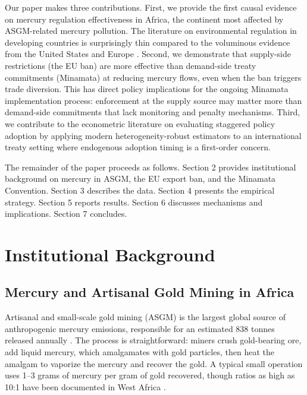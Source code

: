 \documentclass[12pt]{article}
\begin{document}
Our paper makes three contributions. First, we provide the first causal evidence on mercury regulation effectiveness in Africa, the continent most affected by ASGM-related mercury pollution. The literature on environmental regulation in developing countries is surprisingly thin compared to the voluminous evidence from the United States and Europe \citep{greenstone2004did, fowlie2012emissions}. Second, we demonstrate that supply-side restrictions (the EU ban) are more effective than demand-side treaty commitments (Minamata) at reducing mercury flows, even when the ban triggers trade diversion. This has direct policy implications for the ongoing Minamata implementation process: enforcement at the supply source may matter more than demand-side commitments that lack monitoring and penalty mechanisms. Third, we contribute to the econometric literature on evaluating staggered policy adoption by applying modern heterogeneity-robust estimators \citep{callaway2021difference, goodmanbacon2021difference, roth2023whats} to an international treaty setting where endogenous adoption timing is a first-order concern.

The remainder of the paper proceeds as follows. Section 2 provides institutional background on mercury in ASGM, the EU export ban, and the Minamata Convention. Section 3 describes the data. Section 4 presents the empirical strategy. Section 5 reports results. Section 6 discusses mechanisms and implications. Section 7 concludes.


\section{Institutional Background}

\subsection{Mercury and Artisanal Gold Mining in Africa}

Artisanal and small-scale gold mining (ASGM) is the largest global source of anthropogenic mercury emissions, responsible for an estimated 838 tonnes released annually \citep{unep2019global}. The process is straightforward: miners crush gold-bearing ore, add liquid mercury, which amalgamates with gold particles, then heat the amalgam to vaporize the mercury and recover the gold. A typical small operation uses 1--3 grams of mercury per gram of gold recovered, though ratios as high as 10:1 have been documented in West Africa \citep{telmer2009world, veiga2006protocols}.
\end{document}
